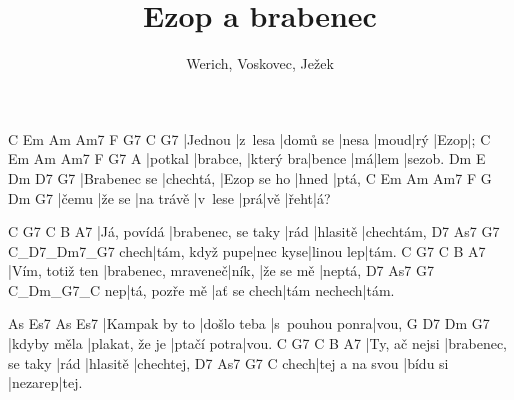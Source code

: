 \documentclass{song}
\title{Ezop a brabenec}
\author{Werich, Voskovec, Ježek}
\begin{document}
\strophe
C       Em      Am       Am7   F    G7  C    G7
|Jednou |z~lesa |domů se |nesa |moud|rý |Ezop|;
C       Em       Am        Am7    F  G7   A
|potkal |brabce, |který bra|bence |má|lem |sezob.
Dm           E         Dm          D7    G7
|Brabenec se |chechtá, |Ezop se ho |hned |ptá,
C     Em     Am        Am7     F   G   Dm   G7
|čemu |že se |na trávě |v~lese |prá|vě |řeht|á?
\endstrophe

\strophe
C           G7                 C    B        A7
|Já, povídá |brabenec, se taky |rád |hlasitě |chechtám,
     D7             As7      G7        C_D7_Dm7_G7
chech|tám, když pupe|nec kyse|linou lep|tám.
C               G7                 C     B         A7
|Vím, totiž ten |brabenec, mraveneč|ník, |že se mě |neptá,
   D7            As7         G7          C_Dm_G7_C
nep|tá, pozře mě |ať se chech|tám nechech|tám.
\endstrophe

\strophe
As            Es7         As             Es7
|Kampak by to |došlo teba |s~pouhou ponra|vou,
G           D7             Dm          G7
|kdyby měla |plakat, že je |ptačí potra|vou.
C             G7                 C    B        A7
|Ty, ač nejsi |brabenec, se taky |rád |hlasitě |chechtej,
     D7             As7      G7      C
chech|tej a na svou |bídu si |nezarep|tej.
\endstrophe

\end{document}
